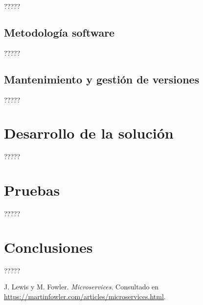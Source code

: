 \documentclass[11pt,spanish,listoffigures]{tfgetsinf}
\begin{document}
?????

\section{Metodología software}

?????

\section{Mantenimiento y gestión de versiones}

?????


\chapter{Desarrollo de la solución}

?????


\chapter{Pruebas}

?????


\chapter{Conclusiones}

?????


\begin{thebibliography}{10}

   J. Lewis y M. Fowler.
   \newblock \textit{Microservices}.
   \newblock Consultado en 
   \url{https://martinfowler.com/articles/microservices.html}.

\end{thebibliography}
\cleardoublepage
\end{document}
